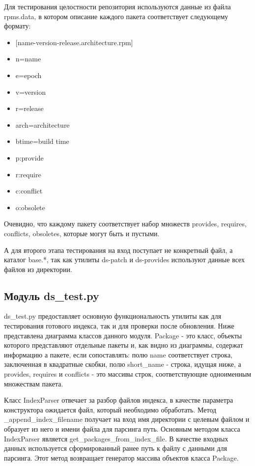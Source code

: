 Для тестирования целостности репозитория используются данные из файла rpms.data,
в котором описание каждого пакета соответствует следующему формату:
\begin{itemize}
\item{[name-version-release.architecture.rpm] }
\item{n=name} %
\item{e=epoch}
\item{v=version}
\item{r=release}
\item{arch=architecture}
\item{btime=build time}%
\item{p:provide}
\item{r:require}
\item{c:conflict}
\item{o:obsolete}
\end{itemize}
Очевидно, что каждому пакету соответствует набор множеств provides,
requires, conflicts, obsoletes, которые могут быть и пустыми.

А для второго этапа тестирования на вход поступает не конкретный файл, а
каталог base.*, так как утилиты ds-patch и ds-provides используют данные
всех файлов из директории.

\subsection{Модуль ds_test.py}
ds_test.py предоставляет основную функциональность утилиты  как для тестирования
готового индекса, так и для проверки после обновления. Ниже представлена диаграмма
классов данного модуля.
Package - это класс, объекты которого представляют отдельные пакеты и, как видно из диаграммы,
содержат информацию а пакете, если сопоставлять: полю name соответствует строка, заключенная
в квадратные скобки, полю short_name - строка, идущая ниже, а provides, requires
и conflicts - это массивы строк, соответствующие одноименным множествам пакета. 

Класс IndexParser отвечает за разбор файлов индекса, в качестве параметра конструктора
ожидается файл, который необходимо обработать. Метод _append_index_filename получает на вход
имя директории с целевым файлом и образует из него и имени файла для парсинга
путь.
Основным методом класса IndexParser является get_packages_from_index_file.
В качестве входных данных используется сформированный ранее путь к файлу с данными
для парсинга. Этот метод возвращает генератор массива объектов класса Package.

